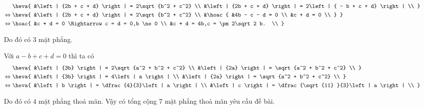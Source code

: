 \begin{ex}
{		\begin{align*}
			&\heva{
				&\left| {2b + c + d} \right| = 2\sqrt {b^2 + c^2} \\
				&\left| {2b + c + d} \right| = 2\left| { - b + c + d} \right| \\ 
			} \\
			\Leftrightarrow{} &\heva{
				&\left| {2b + c + d} \right| = 2\sqrt {b^2 + c^2} \\
				&\hoac{
					&4b - c - d = 0 \\
					&c + d = 0 \\ 
				}
			} \\
			\Leftrightarrow{} &\hoac{
				&c + d = 0 \Rightarrow c = d = 0,b \ne 0 \\
				&c + d = 4b,c =  \pm 2\sqrt 2 b. \\
			}
		\end{align*}
		
		\noindent Do đó có $3$ mặt phẳng.
		
		\noindent Với $a - b + c + d = 0$ thì ta có
		\begin{align*}
			&\heva{
				&\left| {3b} \right| = 2\sqrt {a^2 + b^2 + c^2} \\
				&\left| {2a} \right| = \sqrt {a^2 + b^2 + c^2} \\ 
			} \\
			\Leftrightarrow{} &\heva{
				&\left| {3b} \right| = 4\left| a \right| \\
				&\left| {2a} \right| = \sqrt {a^2 + b^2 + c^2}  \\ 
			} \\
			\Leftrightarrow{} &\heva{
				&\left| b \right| = \dfrac{4}{3}\left| a \right| \\
				&\left| c \right| = \dfrac{\sqrt {11} }{3}\left| a \right| \\ 
			}
		\end{align*}
		
		\noindent Do đó có $4$ mặt phẳng thoả mãn. Vậy có tổng cộng $7$ mặt phẳng thoả mãn yêu cầu đề bài.
	}
\end{ex}

